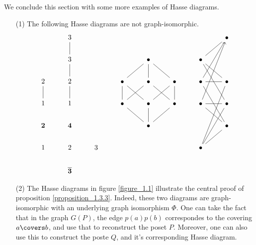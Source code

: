 We conclude this section with some more examples of Hasse diagrams.

\begin{example}\label{exmaple_1.8}
  \begin{enumerate}
    \item[(1)] The following Hasse diagrams are not graph-isomorphic.
      \[\begin{tikzcd}
  & 3 &&&&&& \bullet \\
  & 3 &&& \bullet && \bullet \\
        2 & 2 && \bullet & \bullet & \bullet & \bullet & \bullet \\
        1 & 1 && \bullet & \bullet & \bullet & \bullet & \bullet \\
        {\textbf{2}} & {\textbf{4}} &&& \bullet &&& \bullet \\
        1 & 2 & 3 &&&& \bullet \\
          & {\bar{\textbf{3}}}
          \arrow[no head, from=2-2, to=1-2]
          \arrow[no head, from=2-7, to=1-8]
          \arrow[no head, from=2-7, to=3-8]
          \arrow[no head, from=2-7, to=4-8]
          \arrow[no head, from=3-2, to=2-2]
          \arrow[no head, from=3-4, to=2-5]
          \arrow[no head, from=3-5, to=2-5]
          \arrow[no head, from=3-5, to=4-4]
          \arrow[no head, from=3-5, to=4-6]
          \arrow[no head, from=3-6, to=2-5]
          \arrow[no head, from=3-7, to=1-8]
          \arrow[no head, from=3-7, to=3-8]
          \arrow[no head, from=3-7, to=5-8]
          \arrow[no head, from=4-1, to=3-1]
          \arrow[no head, from=4-2, to=3-2]
          \arrow[no head, from=4-4, to=3-4]
          \arrow[no head, from=4-5, to=3-4]
          \arrow[no head, from=4-5, to=3-6]
          \arrow[no head, from=4-6, to=3-6]
          \arrow[from=4-7, to=1-8]
          \arrow[no head, from=4-7, to=4-8]
          \arrow[no head, from=4-7, to=5-8]
          \arrow[no head, from=5-5, to=4-4]
          \arrow[no head, from=5-5, to=4-5]
          \arrow[no head, from=5-5, to=4-6]
          \arrow[no head, from=6-7, to=3-8]
          \arrow[no head, from=6-7, to=4-8]
          \arrow[no head, from=6-7, to=5-8]
      \end{tikzcd}\]

    \item[(2)] The Hasse diagrams in figure \ref{figure_1.1}
      illustrate the central proof of proposition
      \ref{proposition_1.3.3}. Indeed, these two diagrams are
      graph-isomorphic with an underlying graph isomorphism $\Phi$.
      One can take the fact that in the graph $G(P)$, the edge
      $p(a)p(b)$ correspondes to the covering $a \covers b$, and use
      that to reconstruct the poset $P$. Moreover, one can also use
      this to construct the poste $Q$, and it's corresponding Hasse
      diagram.


\end{enumerate}
\end{example}
